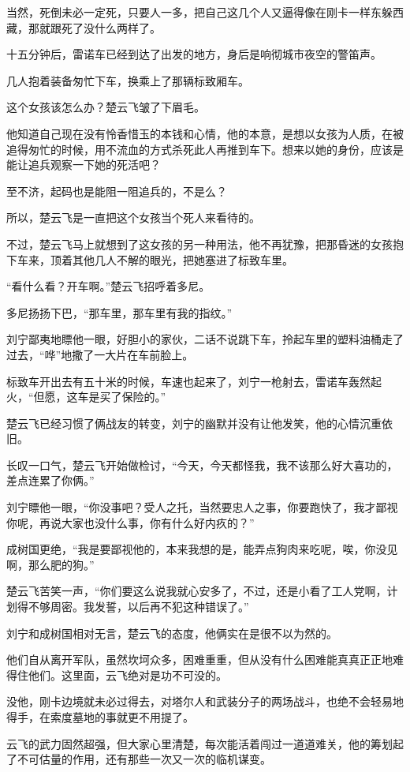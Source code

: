 当然，死倒未必一定死，只要人一多，把自己这几个人又逼得像在刚卡一样东躲西藏，那就跟死了没什么两样了。

十五分钟后，雷诺车已经到达了出发的地方，身后是响彻城市夜空的警笛声。

几人抱着装备匆忙下车，换乘上了那辆标致厢车。

这个女孩该怎么办？楚云飞皱了下眉毛。

他知道自己现在没有怜香惜玉的本钱和心情，他的本意，是想以女孩为人质，在被追得匆忙的时候，用不流血的方式杀死此人再推到车下。想来以她的身份，应该是能让追兵观察一下她的死活吧？

至不济，起码也是能阻一阻追兵的，不是么？

所以，楚云飞是一直把这个女孩当个死人来看待的。

不过，楚云飞马上就想到了这女孩的另一种用法，他不再犹豫，把那昏迷的女孩抱下车来，顶着其他几人不解的眼光，把她塞进了标致车里。

“看什么看？开车啊。”楚云飞招呼着多尼。

多尼扬扬下巴，“那车里，那车里有我的指纹。”

刘宁鄙夷地瞟他一眼，好胆小的家伙，二话不说跳下车，拎起车里的塑料油桶走了过去，“哗”地撒了一大片在车前脸上。

标致车开出去有五十米的时候，车速也起来了，刘宁一枪射去，雷诺车轰然起火，“但愿，这车是买了保险的。”

楚云飞已经习惯了俩战友的转变，刘宁的幽默并没有让他发笑，他的心情沉重依旧。

长叹一口气，楚云飞开始做检讨，“今天，今天都怪我，我不该那么好大喜功的，差点连累了你俩。”

刘宁瞟他一眼，“你没事吧？受人之托，当然要忠人之事，你要跑快了，我才鄙视你呢，再说大家也没什么事，你有什么好内疚的？”

成树国更绝，“我是要鄙视他的，本来我想的是，能弄点狗肉来吃呢，唉，你没见啊，那么肥的狗。”

楚云飞苦笑一声，“你们要这么说我就心安多了，不过，还是小看了工人党啊，计划得不够周密。我发誓，以后再不犯这种错误了。”

刘宁和成树国相对无言，楚云飞的态度，他俩实在是很不以为然的。

他们自从离开军队，虽然坎坷众多，困难重重，但从没有什么困难能真真正正地难得住他们。这里面，云飞绝对是功不可没的。

没他，刚卡边境就未必过得去，对塔尔人和武装分子的两场战斗，也绝不会轻易地得手，在索度墓地的事就更不用提了。

云飞的武力固然超强，但大家心里清楚，每次能活着闯过一道道难关，他的筹划起了不可估量的作用，还有那些一次又一次的临机谋变。

